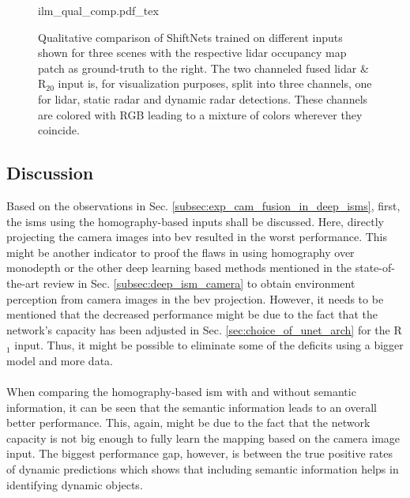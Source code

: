\begin{figure}[H]
	\begin{center}
		{ilm_qual_comp.pdf_tex}
		\caption{\label{fig:ilm_qual_comp}Qualitative comparison of ShiftNets trained on different inputs shown for three scenes with the respective lidar occupancy map patch as ground-truth to the right. The two channeled fused lidar \& R$_{20}$ input is, for visualization purposes, split into three channels, one for lidar, static radar and dynamic radar detections. These channels are colored with RGB leading to a mixture of colors wherever they coincide.}
	\end{center}
\end{figure}
%
\subsection{Discussion}
\label{subsec:discussion_deep_icm_ilm}
Based on the observations in Sec. \ref{subsec:exp_cam_fusion_in_deep_isms}, first, the \gls{ism}s using the homography-based inputs shall be discussed. Here, directly projecting the camera images into \gls{bev} resulted in the worst performance. This might be another indicator to proof the flaws in using homography over \gls{monodepth} or the other deep learning based methods mentioned in the state-of-the-art review in Sec. \ref{subsec:deep_ism_camera} to obtain environment perception from camera images in the \gls{bev} projection. However, it needs to be mentioned that the decreased performance might be due to the fact that the network's capacity has been adjusted in Sec. \ref{sec:choice_of_unet_arch} for the R$_1$ input. Thus, it might be possible to eliminate some of the deficits using a bigger model and more data.
\\\\
When comparing the homography-based \gls{ism} with and without semantic information, it can be seen that the semantic information leads to an overall better performance. This, again, might be due to the fact that the network capacity is not big enough to fully learn the mapping based on the camera image input. The biggest performance gap, however, is between the true positive rates of dynamic predictions which shows that including semantic information helps in identifying dynamic objects.\\
